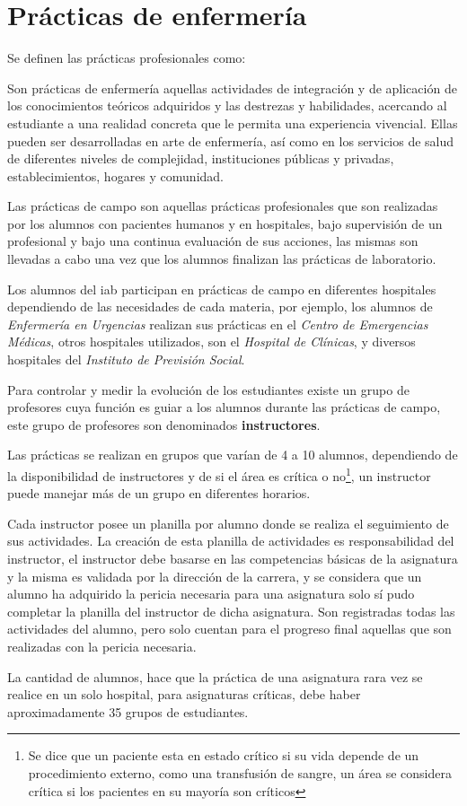 \section{Prácticas de enfermería}
\label{sec:practica_hos}

Se definen las prácticas profesionales como\cite{iab:est_enfemeria}:

\begin{displayquote}

Son prácticas de enfermería aquellas actividades de integración y de aplicación
de los conocimientos teóricos adquiridos y las destrezas y habilidades,
acercando al estudiante a una realidad concreta que le permita una experiencia
vivencial. Ellas pueden ser desarrolladas en arte de enfermería, así como en los
servicios de salud de diferentes niveles de complejidad, instituciones públicas
y privadas, establecimientos, hogares y comunidad.

\end{displayquote}

Las prácticas de campo son aquellas prácticas profesionales que son realizadas
por los alumnos con pacientes humanos y en hospitales, bajo supervisión de un
profesional y bajo una continua evaluación de sus acciones, las mismas son
llevadas a cabo una vez que los alumnos finalizan las prácticas de laboratorio.

Los alumnos del \Gls{iab} participan en prácticas de campo en diferentes
hospitales dependiendo de las necesidades de cada materia, por ejemplo, los
alumnos de \textit{Enfermería en Urgencias} realizan sus prácticas en el
\textit{Centro de Emergencias Médicas}, otros hospitales utilizados, son el
\textit{Hospital de Clínicas}, y diversos hospitales del \textit{Instituto de
    Previsión Social}.

Para controlar y medir la evolución de los estudiantes existe un grupo de
profesores cuya función es guiar a los alumnos durante las prácticas de campo,
este grupo de profesores son denominados \textbf{instructores}.

Las prácticas se realizan en grupos que varían de 4 a 10 alumnos, dependiendo de
la disponibilidad de instructores y de si el área es crítica o no\footnote{Se
    dice que un paciente esta en estado crítico si su vida depende de un
    procedimiento externo, como una transfusión de sangre, un área se considera
    crítica si los pacientes en su mayoría son críticos}, un instructor puede
manejar más de un grupo en diferentes horarios. 

Cada instructor posee un planilla por alumno donde se realiza el seguimiento de
sus actividades. La creación de esta planilla de actividades es responsabilidad
del instructor, el instructor debe basarse en las competencias básicas de la
asignatura y la misma es validada por la dirección de la carrera, y se considera
que un alumno ha adquirido la pericia necesaria para una asignatura solo sí pudo
completar la planilla del instructor de dicha asignatura. Son registradas todas
las actividades del alumno, pero solo cuentan para el progreso final aquellas
que son realizadas con la pericia necesaria.

La cantidad de alumnos, hace que la práctica de una asignatura rara vez se
realice en un solo hospital, para asignaturas críticas, debe haber
aproximadamente 35 grupos de estudiantes.
